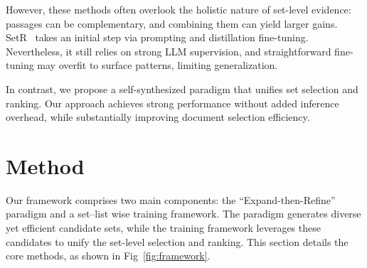 \documentclass[11pt]{article}
\begin{document}



However, these methods often overlook the holistic nature of set-level evidence: passages can be complementary, and combining them can yield larger gains. SetR~\citep{lee2025shifting} takes an initial step via prompting and distillation fine-tuning. Nevertheless, it still relies on strong LLM supervision, and straightforward fine-tuning may overfit to surface patterns, limiting generalization. 

In contrast, we propose a self-synthesized paradigm that unifies set selection and ranking. Our approach achieves strong performance without added inference overhead, while substantially improving document selection efficiency.





\section{Method}
Our framework comprises two main components: the ``Expand-then-Refine'' paradigm and a set–list wise training framework. The paradigm generates diverse yet efficient candidate sets, while the training framework leverages these candidates to unify the set-level selection and ranking. 
This section details the core methods, as shown in Fig~\ref{fig:framework}.
\end{document}
